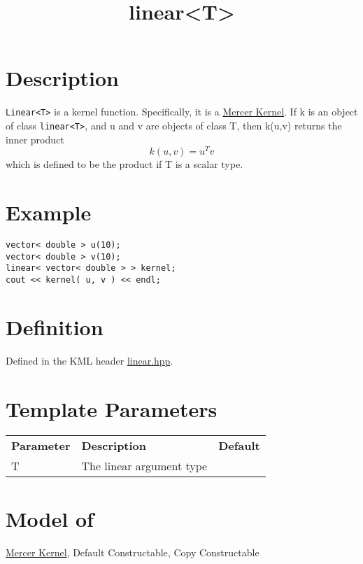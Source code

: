 \documentclass{article}
\begin{document}
\title{linear<T>}
\maketitle

\section*{Description}

\texttt{Linear<T>} is a kernel function. Specifically, it is a \href{research/kml/documentation/mercer_kernel.html}{Mercer Kernel}.
 If k is an object of class \texttt{linear<T>}, and u and v are objects of class T, then k(u,v) returns the inner product 
%
$$k(u,v) = u^T v $$
%
which is defined to be the product if T is a scalar type. 


\section*{Example}

\highlightcpp{}
\begin{verbatim}
vector< double > u(10);
vector< double > v(10);
linear< vector< double > > kernel;
cout << kernel( u, v ) << endl;
\end{verbatim}


\section*{Definition}

Defined in the KML header \href{linear.hpp}{linear.hpp}.


\section*{Template Parameters}

\begin{tabular}{lll}
\textbf{Parameter} & \textbf{Description} & \textbf{Default} \\ 
T & The linear argument type \\ 
\end{tabular}


\section*{Model of}

\href{research/kml/documentation/mercer_kernel.html}{Mercer Kernel}, 
Default Constructable, Copy Constructable
\end{document}
